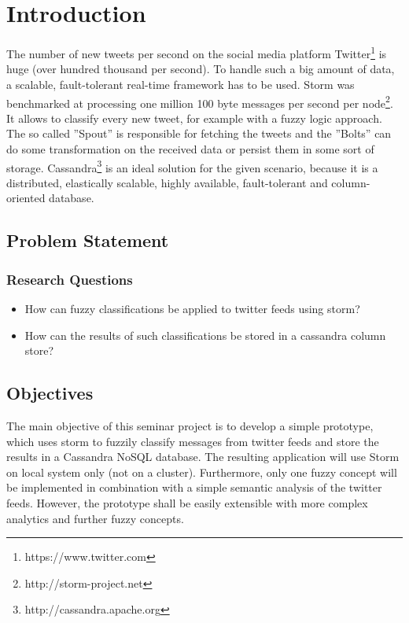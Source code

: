 \documentclass[a4paper]{article}
\begin{document}
  





\pagestyle{plain}
\newpage

\tableofcontents
\newpage

\section{Introduction}

The number of new tweets per second on the social media platform Twitter\footnote{https://www.twitter.com} is huge (over hundred thousand per second). To handle such a big amount of data, a scalable, fault-tolerant real-time framework has to be used. Storm was benchmarked at processing one million 100 byte messages per second per node\footnote{http://storm-project.net}. It allows to classify every new tweet, for example with a fuzzy logic approach. The so called ''Spout'' is responsible for fetching the tweets and the ''Bolts'' can do some transformation on the received data or persist them in some sort of storage. Cassandra\footnote{http://cassandra.apache.org} is an ideal solution for the given scenario, because it is a distributed, elastically scalable, highly available, fault-tolerant and column-oriented database.

\subsection{Problem Statement}

\subsubsection{Research Questions}
\vspace{0.5cm}
\begin{itemize}
\item How can fuzzy classifications be applied to twitter feeds using storm?
\item How can the results of such classifications be stored in a cassandra column store?
\end{itemize}



\subsection{Objectives}

The main objective of this seminar project is to develop a simple prototype, which uses storm to fuzzily classify messages from twitter feeds and store the results in a Cassandra NoSQL database.
The resulting application will use Storm on local system only (not on a cluster). Furthermore, only one fuzzy concept will be implemented in combination with a simple semantic analysis of the twitter feeds. However, the prototype shall be easily extensible with more complex analytics and further fuzzy concepts.
\end{document}
